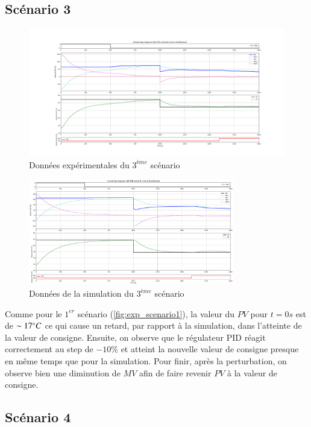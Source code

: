 \subsection{Scénario 3}

\begin{figure}[H]
	\centering
	\includegraphics[width=1\textwidth]{../Plots/Experiment_scenario_5_2024-03-30-15h32.png}
	\caption{Données expérimentales du $3^{ème}$ scénario}
	\label{fig:exp_scenario3}
\end{figure}
\begin{figure}[H]
	\centering
	\includegraphics[width=0.8\textwidth]{figures/scenario5.png}
	\caption{Données de la simulation du $3^{ème}$ scénario}
	\label{fig:sim_scenario3}
\end{figure}

Comme pour le $1^{er}$ scénario (\ref{fig:exp_scenario1}), la valeur du $PV$ pour $t = 0s$ est de $\sim 17\degree C$ ce qui cause un retard, par rapport à la simulation, dans l'atteinte de la valeur
de consigne. Ensuite, on observe que le régulateur PID réagit correctement au step de $-10\%$ et atteint la nouvelle valeur de consigne presque en même temps que
pour la simulation. Pour finir, après la perturbation, on observe bien une diminution de $MV$ afin de faire revenir $PV$ à la valeur de consigne. 

\subsection{Scénario 4}

